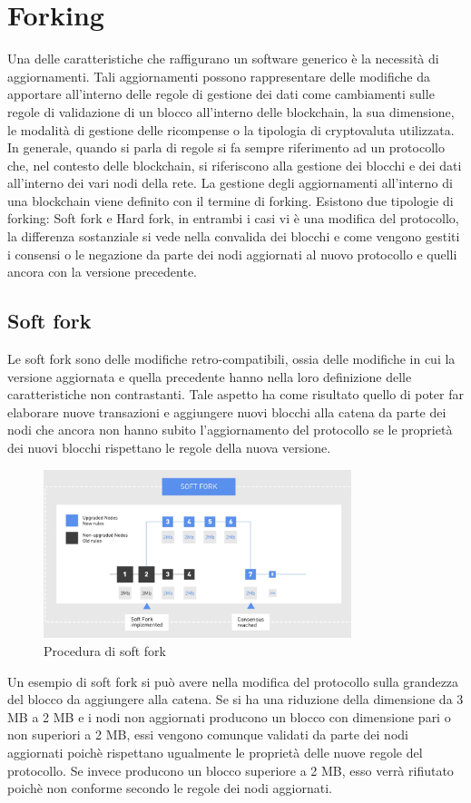 \section{Forking}
Una delle caratteristiche che raffigurano un software generico è la necessità di aggiornamenti. Tali aggiornamenti possono rappresentare delle modifiche da apportare all'interno delle regole di gestione dei dati come cambiamenti sulle regole di validazione di un blocco all'interno delle blockchain, la sua dimensione, le modalità di gestione delle ricompense o la tipologia di cryptovaluta utilizzata. In generale, quando si parla di regole si fa sempre riferimento ad un protocollo che, nel contesto delle blockchain, si riferiscono alla gestione dei blocchi e dei dati all'interno dei vari nodi della rete. La gestione degli aggiornamenti all'interno di una blockchain viene definito con il termine di forking. Esistono due tipologie di forking: Soft fork e Hard fork, in entrambi i casi vi è una modifica del protocollo, la differenza sostanziale si vede nella convalida dei blocchi e come vengono gestiti i consensi o le negazione da parte dei nodi aggiornati al nuovo protocollo e quelli ancora con la versione precedente.
\subsection{Soft fork}
Le soft fork sono delle modifiche retro-compatibili, ossia delle modifiche in cui la versione aggiornata e quella precedente hanno nella loro definizione delle caratteristiche non contrastanti. Tale aspetto ha come risultato quello di poter far elaborare nuove transazioni e aggiungere nuovi blocchi alla catena da parte dei nodi che ancora non hanno subito l'aggiornamento del protocollo se le proprietà dei nuovi blocchi rispettano le regole della nuova versione.
\begin{figure}[h]
    \centering
    \includegraphics[width=0.8\textwidth]{img/soft-fork.png}
    \caption{Procedura di soft fork}
    \label{fig:soft-fork}
\end{figure}
Un esempio di soft fork si può avere nella modifica del protocollo sulla grandezza del blocco da aggiungere alla catena. Se si ha una riduzione della dimensione da 3 MB a 2 MB e i nodi non aggiornati producono un blocco con dimensione pari o non superiori a 2 MB, essi vengono comunque validati da parte dei nodi aggiornati poichè rispettano ugualmente le proprietà delle nuove regole del protocollo. Se invece producono un blocco superiore a 2 MB, esso verrà rifiutato poichè non conforme secondo le regole dei nodi aggiornati.
